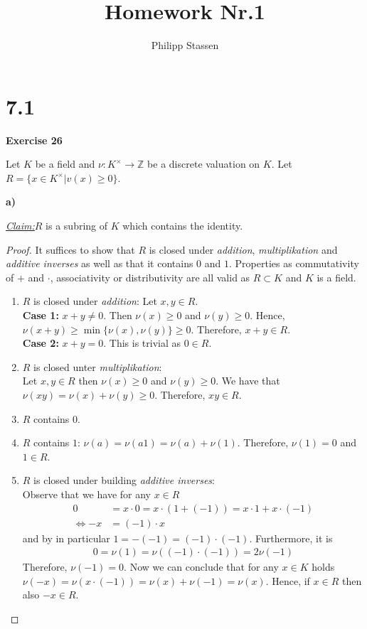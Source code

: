 \documentclass{article}
\title{Homework Nr.1}
\author{Philipp Stassen}
\newcommand{\Z}{\mathbb{Z}}
\newcommand{\claim}
{\underline{\textit{Claim:}}\hspace{0,2cm}}
\newcommand{\aufgabe}[1]{
{
	\vspace*{0.5cm}
	\noindent\textsf{\textbf{Exercise #1}}
	\vspace*{0.2cm}

}
}
\newcommand{\teilaufgabe}[1]{
{       

	\noindent\hspace*{0,1 cm}\textbf{#1)}
}
}
\theoremstyle{definition}
\theoremstyle{plain}
\theoremstyle{remark}
\begin{document}
\maketitle
\section*{7.1}
\aufgabe{26} Let $K$ be a field and $\nu:K^{\times}\rightarrow\Z$ be a discrete valuation on $K$. Let $R = \{x\in K^{\times} | v(x) \geq 0\}$.

\teilaufgabe{a} \claim $R$ is a subring of $K$ which contains the identity.
\begin{proof}
	It suffices to show that $R$ is closed under \textit{addition}, \textit{multiplikation} and \textit{additive inverses} as well as that it contains $0$ and $1$. Properties as commutativity of $+$ and $\cdot$, associativity or distributivity are all valid as $R \subset K$ and $K$ is a field.
\begin{enumerate}
	\item $R$ is closed under \textit{addition}:
		Let $x,y\in R$. \\
		\textbf{Case 1:} $x+y \neq 0$. Then $\nu(x)\geq 0$ and $\nu(y)\geq 0$. 
		Hence, $\nu(x+y)\geq \min\{\nu(x),\nu(y)\}\geq 0$. Therefore, $x+y\in R$. \\
		\textbf{Case 2:} $x+y = 0$. This is trivial as $0\in R$.
	\item $R$ is closed unter \textit{multiplikation}:\\
		Let $x,y\in R$ then $\nu(x)\geq 0$ and $\nu(y)\geq 0$. 
		We have that $\nu(xy) = \nu(x) + \nu(y) \geq 0$. Therefore, $xy\in R$.
	\item $R$ contains $0$.
	\item $R$ contains $1$:
		$\nu (a) = \nu (a 1) = \nu(a) +\nu(1)$. Therefore, $\nu(1) = 0$ and $1\in R$.
	\item $R$ is closed under building \textit{additive inverses}: \\
		Observe that we have for any $x\in R$
		\begin{align}
			0 &= x \cdot 0 = x \cdot (1 + (-1)) = x\cdot 1 + x\cdot (-1) \\
			\Longleftrightarrow  -x &= (-1)\cdot x
		\end{align}
		and by in particular $1=-(-1)= (-1)\cdot (-1)$.
		Furthermore, it is
		\begin{align}
			0=\nu(1) = \nu((-1)\cdot (-1)) = 2\nu(-1)
		\end{align}
		Therefore, $\nu(-1)=0$.
		Now we can conclude that for any $x\in K$ holds $\nu(-x) = \nu(x\cdot (-1)) = \nu(x) + \nu(-1) = \nu(x)$. Hence, if $x\in R$ then also $-x\in R$.
\end{enumerate}
\end{proof}
\end{document}
